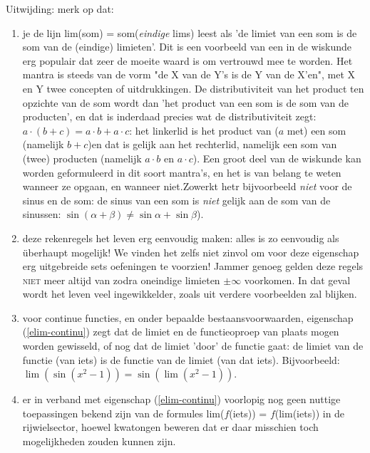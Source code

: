 \documentclass[numbers]{ximera}
\begin{document}
Uitwijding: merk op dat:
\begin{enumerate}
	\item je de lijn lim(som) = som(\textit{eindige} lims) leest als 'de limiet van een som is de som van de (eindige) limieten'. Dit is een voorbeeld van een in de wiskunde erg populair  dat zeer de moeite waard is om vertrouwd mee te worden. Het mantra is steeds van de vorm "de X van de Y's is de Y van de X'en", met X en Y twee concepten of uitdrukkingen. De distributiviteit van het product ten opzichte van de som wordt dan 'het product van een som is de som van de producten', en dat is inderdaad precies wat de distributiviteit zegt: $a\cdot(b+c) = a\cdot b+a\cdot c$: het linkerlid is het product van ($a$ met) een som (namelijk $b+c$)en dat is gelijk aan het rechterlid, namelijk een som van (twee) producten (namelijk $a\cdot b$ en $a\cdot c$). Een groot deel van de wiskunde kan worden geformuleerd in dit soort mantra's, en het is van belang te weten wanneer ze opgaan, en wanneer niet.Zowerkt hetr bijvoorbeeld \textit{niet} voor de sinus en de som: de sinus van een som is \textit{niet} gelijk aan de som van de sinussen: $\sin(\alpha+\beta) \neq \sin\alpha+\sin\beta$). 
	\item deze rekenregels het leven erg eenvoudig maken: alles is zo eenvoudig als überhaupt mogelijk! We vinden het zelfs niet zinvol om voor deze eigenschap erg uitgebreide sets oefeningen te voorzien! Jammer genoeg gelden deze regels \textsc{niet} meer altijd van zodra oneindige limieten $\pm\infty$ voorkomen. In dat geval wordt het leven veel ingewikkelder, zoals uit verdere voorbeelden zal blijken.
	\item voor continue functies, en onder bepaalde bestaansvoorwaarden, eigenschap (\ref{elim-continu}) zegt dat de limiet en de functieoproep van plaats mogen worden gewisseld, of nog dat de limiet 'door' de functie gaat: de limiet van de functie (van iets) is de functie van de limiet (van dat iets). Bijvoorbeeld: $\lim(\sin(x^2-1)) = \sin(\lim(x^2-1))$.
	\item er in verband met eigenschap (\ref{elim-continu}) voorlopig nog geen nuttige toepassingen bekend zijn van de formules lim($f$(iets)) =  $f$(lim(iets)) in de rijwielsector, hoewel kwatongen beweren dat er daar misschien toch mogelijkheden  zouden kunnen zijn. 
\end{enumerate}
\end{document}

